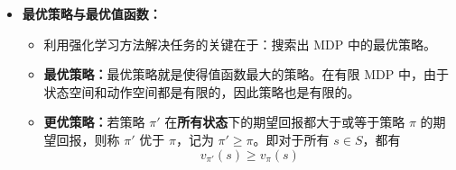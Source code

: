\documentclass[../main.tex]{subfiles}
\begin{document}
\begin{enumerate}
\begin{itemize}
{\begin{itemize}
    \item 同理，可以列出其余状态的状态值方程组。由题图可得：
    $$
    \left\{
    \begin{aligned}
    v_{\pi}(S_1)
    &=\frac{1}{3}\bigl(0+0.8\,v_{\pi}(S_6)\bigr)
     +\frac{1}{3}\bigl(1+0.8\times 0\bigr)
     +\frac{1}{3}\bigl(0+0.8\,v_{\pi}(S_2)\bigr) \\
    v_{\pi}(S_2)
    &=\frac{1}{3}\bigl(0+0.8\,v_{\pi}(S_7)\bigr)
     +\frac{1}{3}\bigl(0+0.8\,v_{\pi}(S_1)\bigr)
     +\frac{1}{3}\bigl(0+0.8\,v_{\pi}(S_3)\bigr) \\
    &\qquad \vdots \\
    v_{\pi}(S_{11})
    &=\frac{1}{4}\bigl(0+0.8\,v_{\pi}(S_{16})\bigr)
     +\frac{1}{4}\bigl(0+0.8\,v_{\pi}(S_6)\bigr)
     +\frac{1}{4}\bigl(0+0.8\,v_{\pi}(S_{10})\bigr)
     +\frac{1}{4}\bigl(-10+0.8\,v_{\pi}(S_{11})\bigr) \\
    &\qquad \vdots \\
    v_{\pi}(S_{13})
    &=\frac{1}{4}\bigl(0+0.8\,v_{\pi}(S_{18})\bigr)
     +\frac{1}{4}\bigl(0+0.8\,v_{\pi}(S_8)\bigr)
     +\frac{1}{4}\bigl(-10+0.8\,v_{\pi}(S_{13})\bigr)
     +\frac{1}{4}\bigl(0+0.8\,v_{\pi}(S_{14})\bigr) \\
    &\qquad \vdots \\
    v_{\pi}(S_{23})
    &=\frac{1}{3}\bigl(0+0.8\,v_{\pi}(S_{18})\bigr)
     +\frac{1}{3}\bigl(0+0.8\,v_{\pi}(S_{22})\bigr)
     +\frac{1}{3}\bigl(0+0.8\,v_{\pi}(S_{24})\bigr) \\
    v_{\pi}(S_{24})
    &=\frac{1}{2}\bigl(3+0.8\times 0\bigr)
     +\frac{1}{2}\bigl(0+0.8\,v_{\pi}(S_{23})\bigr)
    \end{aligned}
    \right.
    $$

    \item 由上述方程组联立求解，即可得到各状态的状态值。
\end{itemize}
}

\item \textbf{最优策略与最优值函数：}
\begin{itemize}
    \item 利用强化学习方法解决任务的关键在于：搜索出 MDP 中的最优策略。
    
    \item \textbf{最优策略：}最优策略就是使得值函数最大的策略。在有限 MDP 中，由于状态空间和动作空间都是有限的，因此策略也是有限的。
    
    \item \textbf{更优策略：}若策略 $\pi'$ 在\textbf{所有状态}下的期望回报都大于或等于策略 $\pi$ 的期望回报，则称 $\pi'$ 优于 $\pi$，记为 $\pi'\geq \pi$。即对于所有 $s\in S$，都有
    $$
    v_{\pi'}(s)\geq v_{\pi}(s)
    $$
    

\end{itemize}
\end{itemize}
\end{enumerate}
\end{document}
